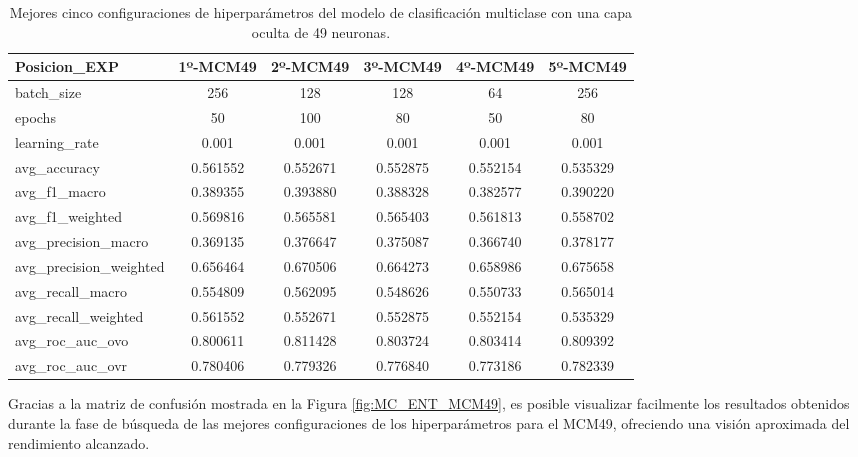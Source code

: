 \begin{table}[H]
\begin{tabular}{|>{\columncolor[HTML]{E0FFFF}}l|c|c|c|c|c|}
\hline
Posicion\_EXP & 1º-MCM49 & 2º-MCM49 & 3º-MCM49 & 4º-MCM49 & 5º-MCM49 \\
\hline
\cellcolor[HTML]{E0FFFF}batch\_size & \cellcolor[HTML]{66ffa8}256 & \cellcolor[HTML]{66ffa8}128 & \cellcolor[HTML]{66ffa8}128 & \cellcolor[HTML]{66ffa8}64 & \cellcolor[HTML]{66ffa8}256 \\
\cellcolor[HTML]{E0FFFF}epochs & \cellcolor[HTML]{b1bafb}50 & \cellcolor[HTML]{b1bafb}100 & \cellcolor[HTML]{b1bafb}80 & \cellcolor[HTML]{b1bafb}50 & \cellcolor[HTML]{b1bafb}80 \\
\cellcolor[HTML]{E0FFFF}learning\_rate & \cellcolor[HTML]{f99595}0.001 & \cellcolor[HTML]{f99595}0.001 & \cellcolor[HTML]{f99595}0.001 & \cellcolor[HTML]{f99595}0.001 & \cellcolor[HTML]{f99595}0.001 \\
\cellcolor[HTML]{E0FFFF}avg\_accuracy & 0.561552 & 0.552671 & 0.552875 & 0.552154 & 0.535329 \\
\cellcolor[HTML]{E0FFFF}avg\_f1\_macro & 0.389355 & 0.393880 & 0.388328 & 0.382577 & 0.390220 \\
\cellcolor[HTML]{E0FFFF}avg\_f1\_weighted & 0.569816 & 0.565581 & 0.565403 & 0.561813 & 0.558702 \\
\cellcolor[HTML]{E0FFFF}avg\_precision\_macro & 0.369135 & 0.376647 & 0.375087 & 0.366740 & 0.378177 \\
\cellcolor[HTML]{E0FFFF}avg\_precision\_weighted & 0.656464 & 0.670506 & 0.664273 & 0.658986 & 0.675658 \\
\cellcolor[HTML]{E0FFFF}avg\_recall\_macro & 0.554809 & 0.562095 & 0.548626 & 0.550733 & 0.565014 \\
\cellcolor[HTML]{E0FFFF}avg\_recall\_weighted & 0.561552 & 0.552671 & 0.552875 & 0.552154 & 0.535329 \\
\cellcolor[HTML]{E0FFFF}avg\_roc\_auc\_ovo & 0.800611 & 0.811428 & 0.803724 & 0.803414 & 0.809392 \\
\cellcolor[HTML]{E0FFFF}avg\_roc\_auc\_ovr & 0.780406 & 0.779326 & 0.776840 & 0.773186 & 0.782339 \\
\hline
\end{tabular}
    \caption{Mejores cinco configuraciones de hiperparámetros del modelo de clasificación multiclase con una capa oculta de 49 neuronas.}
    \label{fig:MULhs49}
\end{table}

Gracias a la matriz de confusión mostrada en la Figura \ref{fig:MC_ENT_MCM49}, es posible visualizar facilmente los resultados obtenidos durante la fase de búsqueda de las mejores configuraciones de los hiperparámetros para el MCM49, ofreciendo una visión aproximada del rendimiento alcanzado.


